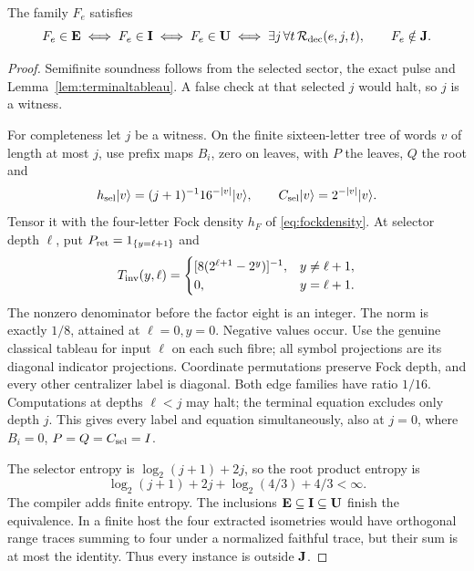 \begin{theorem}\label{thm:sharedfamily}
The family $F_e$ satisfies
\[
 F_e\in\mathbf E\iff F_e\in\mathbf I\iff F_e\in\mathbf U
 \iff\exists j\,\forall t\,\mathcal R_{\rm dec}(e,j,t),\qquad F_e\notin\mathbf J.
\]
\end{theorem}
\begin{proof}
Semifinite soundness follows from the selected sector, the exact pulse
and Lemma~\ref{lem:terminaltableau}. A false check at that selected $j$
would halt, so $j$ is a witness.

For completeness let $j$ be a witness. On the finite sixteen-letter
tree of words $v$ of length at most $j$, use prefix maps $B_i$, zero
on leaves, with $P$ the leaves, $Q$ the root and
\[
 h_{\rm sel}|v\rangle=(j+1)^{-1}16^{-|v|}|v\rangle,
 \qquad C_{\rm sel}|v\rangle=2^{-|v|}|v\rangle.
\]
Tensor it with the four-letter Fock density $h_F$ of
\eqref{eq:fockdensity}. At selector depth $\ell$, put
$P_{\rm ret}=1_{\{y=\ell+1\}}$ and
\[
 T_{\rm inv}(y,\ell)=
 \begin{cases}[8(2^{\ell+1}-2^y)]^{-1},&y\ne\ell+1,\\
 0,&y=\ell+1.\end{cases}
\]
The nonzero denominator before the factor eight is an integer. The norm
is exactly $1/8$, attained at $\ell=0,y=0$. Negative values occur.
Use the genuine classical tableau for input $\ell$ on each such fibre;
all symbol projections are its diagonal indicator projections. Coordinate
permutations preserve Fock depth, and every other centralizer label is
diagonal. Both edge families have ratio $1/16$. Computations at depths
$\ell<j$ may halt; the terminal equation excludes only depth $j$.
This gives every label and equation simultaneously, also at $j=0$,
where $B_i=0$, $P=Q=C_{\rm sel}=I$.

The selector entropy is $\log_2(j+1)+2j$, so the root product entropy is
\[
 \log_2(j+1)+2j+\log_2(4/3)+4/3<\infty.
\]
The compiler adds finite entropy. The inclusions
$\mathbf E\subseteq\mathbf I\subseteq\mathbf U$ finish the equivalence. In a finite
host the four extracted isometries would have orthogonal range traces
summing to four under a normalized faithful trace, but their sum is at
most the identity. Thus every instance is outside $\mathbf J$.
\end{proof}
